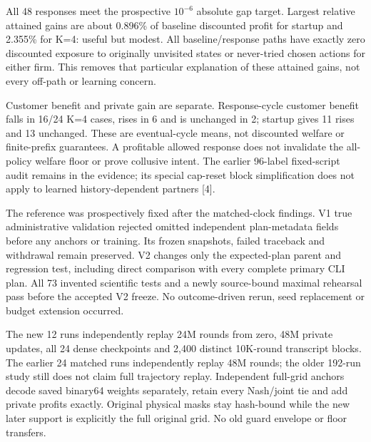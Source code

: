 \documentclass[a4paper,10pt]{article}
\newcommand{\reportheading}[1]{\par\vspace{5pt}{\large\bfseries\color{ink}#1}\par\vspace{2pt}}
\begin{document}
{\fontsize{9.4}{11.6}\selectfont All 48 responses meet the prospective $10^{-6}$ absolute gap target. Largest relative attained gains are about 0.896\% of baseline discounted profit for startup and 2.355\% for K=4: useful but modest. All baseline/response paths have exactly zero discounted exposure to originally unvisited states or never-tried chosen actions for either firm. This removes that particular explanation of these attained gains, not every off-path or learning concern.\par}

{\fontsize{9.4}{11.6}\selectfont Customer benefit and private gain are separate. Response-cycle customer benefit falls in 16/24 K=4 cases, rises in 6 and is unchanged in 2; startup gives 11 rises and 13 unchanged. These are eventual-cycle means, not discounted welfare or finite-prefix guarantees. A profitable allowed response does not invalidate the all-policy welfare floor or prove collusive intent. The earlier 96-label fixed-script audit remains in the evidence; its special cap-reset block simplification does not apply to learned history-dependent partners [4].\par}

\clearpage


\reportheading{Appendix: Full-grid replay, scope and resources}

The reference was prospectively fixed after the matched-clock findings. V1 true administrative validation rejected omitted independent plan-metadata fields before any anchors or training. Its frozen snapshots, failed traceback and withdrawal remain preserved. V2 changes only the expected-plan parent and regression test, including direct comparison with every complete primary CLI plan. All 73 invented scientific tests and a newly source-bound maximal rehearsal pass before the accepted V2 freeze. No outcome-driven rerun, seed replacement or budget extension occurred.
\par

The new 12 runs independently replay 24M rounds from zero, 48M private updates, all 24 dense checkpoints and 2,400 distinct 10K-round transcript blocks. The earlier 24 matched runs independently replay 48M rounds; the older 192-run study still does not claim full trajectory replay. Independent full-grid anchors decode saved binary64 weights separately, retain every Nash/joint tie and add private profits exactly. Original physical masks stay hash-bound while the new later support is explicitly the full original grid. No old guard envelope or floor transfers.
\par
\end{document}
